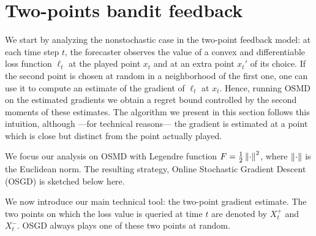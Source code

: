 \section{Two-points bandit feedback}
%
We start by analyzing the nonstochastic case in the two-point feedback model: at each time step $t$, the forecaster observes the value of a convex and differentiable loss function $\ell_t$ at the played point $x_t$ and at an extra point $x_t'$ of its choice. If the second point is chosen at random in a neighborhood of the first one, one can use it to compute an estimate of the gradient of $\ell_t$ at $x_t$. Hence, running OSMD on the estimated gradients we obtain a regret bound controlled by the second moments of these estimates. The algorithm we present in this section follows this intuition, although ---for technical reasons--- the gradient is estimated at a point which is close but distinct from the point actually played.

We focus our analysis on OSMD with Legendre function $F = \tfrac{1}{2}\left\|{\cdot}\right\|^2$, where $\left\|{\cdot}\right\|$ is the Euclidean norm. The resulting strategy, Online Stochastic Gradient Descent (OSGD) is sketched below here.
%

We now introduce our main technical tool: the two-point gradient estimate. The two points on which the loss value is queried at time $t$ are denoted by $X_t^+$ and $X_t^-$. OSGD always plays one of these two points at random.

